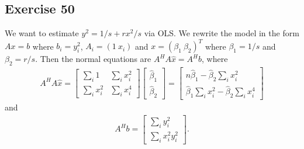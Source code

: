 \documentclass[11.5pt, letterpaper, bibtotoc,
    tablecaptionabove, figurecaptionabove]{article}
\begin{document}
\subsection*{Exercise 50}
We want to estimate $y^2=1/s+rx^2/s$ via OLS.
We rewrite the model in the form $Ax=b$ where
$b_i=y_i^2$, $A_i=(1\ x_i)$ and $x=(\beta_1\ \beta_2)^T$ where $\beta_1=1/s$ and $\beta_2=r/s$.
Then the normal equations are $A^HA\hat{x}=A^Hb$, where
\begin{align*}
    A^HA\hat{x} =
    \begin{bmatrix}
        \sum_i 1 & \sum_ix_i^2\\
        \sum_ix_i^2& \sum_ix_i^4
    \end{bmatrix} 
    \begin{bmatrix}
        \hat{\beta}_1\\ \hat{\beta}_2
    \end{bmatrix} =
    \begin{bmatrix}
        n\hat{\beta}_1 - \hat{\beta}_2\sum_i x_i^2\\
        \hat{\beta}_1\sum_ix_i^2 - \hat{\beta}_2\sum_ix_i^4
    \end{bmatrix}
\end{align*}
and
\begin{align*}
    A^Hb=
    \begin{bmatrix}
        \sum_i y_i^2\\
        \sum_i x_i^2y_i^2
    \end{bmatrix}.
\end{align*}
\end{document}
